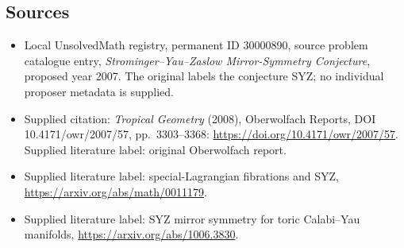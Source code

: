 \documentclass[11pt]{article}
\begin{document}
\subsection{Sources}
\begin{itemize}\item Local UnsolvedMath registry, permanent ID 30000890, source problem catalogue entry, \emph{Strominger--Yau--Zaslow Mirror-Symmetry Conjecture}, proposed year 2007. The original labels the conjecture SYZ; no individual proposer metadata is supplied.\item Supplied citation: \emph{Tropical Geometry} (2008), Oberwolfach Reports, DOI 10.4171/owr/2007/57, pp.\ 3303--3368: \url{https://doi.org/10.4171/owr/2007/57}. Supplied literature label: original Oberwolfach report.\item Supplied literature label: special-Lagrangian fibrations and SYZ, \url{https://arxiv.org/abs/math/0011179}.\item Supplied literature label: SYZ mirror symmetry for toric Calabi--Yau manifolds, \url{https://arxiv.org/abs/1006.3830}.\end{itemize}
\end{document}
